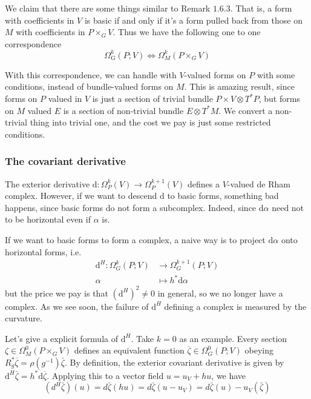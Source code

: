 \documentclass[11pt]{amsart}
\numberwithin{equation}{section}
\theoremstyle{plain}
\theoremstyle{plain}
\numberwithin{equation}{section}
\begin{document}
We claim that there are some things similar to Remark $1.6.3$. That is, a form with coefficients in $V$ is basic if and only if it's a form pulled back from those on $M$ with coefficients in $P\times_GV$. Thus we have the following one to one correspondence
$$
\Omega_{\mathrm{G}}^{k}(P;V) \Longleftrightarrow\Omega^{k}_M(P\times_GV)
$$


With this correspondence, we can handle with $V$-valued forms on $P$ with some conditions, instead of bundle-valued forms on $M$. This is amazing result, since forms on $P$ valued in $V$ is just a section of trivial bundle $P\times V\otimes T^*P$, but forms on $M$ valued $E$ is a section of non-trivial bundle $E\otimes T^*M$. We convert a non-trivial thing into trivial one, and the cost we pay is just some restricted conditions.

\subsubsection{The covariant derivative}
The exterior derivative $\mathrm{d}:\Omega^k_P(V)\to\Omega_P^{k+1}(V)$ defines a $V$-valued de Rham complex. However, if we want to descend $\mathrm{d}$ to basic forms, something bad happens, since basic forms do not form a subcomplex. Indeed, since $\mathrm{d}\alpha$ need not to be horizontal even if $\alpha$ is. 

If we want to basic forms to form a complex, a naive way is to project $\mathrm{d}\alpha$ onto horizontal forms, i.e.
$$
\begin{aligned}
\mathrm{d}^H:\Omega_G^k(P;V)&\to\Omega_G^{k+1}(P;V)\\
\alpha&\mapsto h^*\mathrm{d}\alpha
\end{aligned}
$$
but the price we pay is that $(\mathrm{d}^H)^2\neq0$ in general, so we no longer have a complex. As we see soon, the failure of $\mathrm{d}^H$ defining a complex is measured by the curvature.

Let's give a explicit formula of $\mathrm{d}^H$. Take $k=0$ as an example. Every section $\zeta\in\Omega^0_M(P\times_GV)$ defines an equivalent function $\overline{\zeta}\in\Omega_G^0(P;V)$ obeying $R_g^*\overline{\zeta}=\rho(g^{-1})\bar{\zeta}$. By definition, the exterior covariant derivative is given by $\mathrm{d}^H\overline{\zeta}=h^*\mathrm{d}\overline{\zeta}$. Applying this to a vector field $u=u_V+hu$, we have
$$
\left(d^{H} \bar{\zeta}\right)(u)=d \bar{\zeta}(h u)=d \bar{\zeta}\left(u-u_{V}\right)=d \bar{\zeta}(u)-u_{V}(\bar{\zeta})
$$
\end{document}
